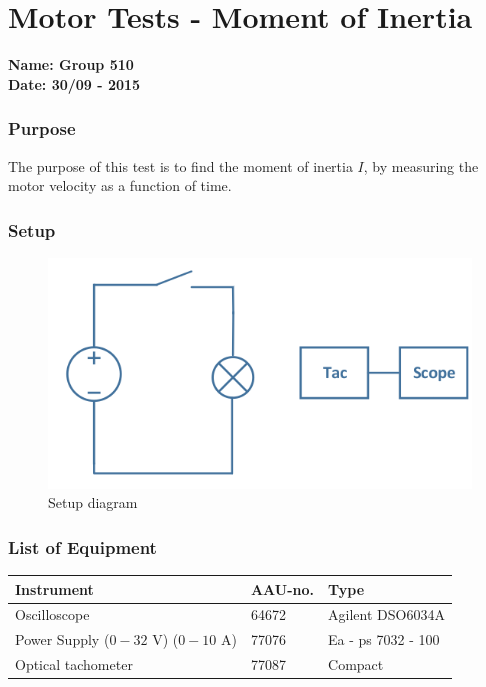 \pagebreak
\section{Motor Tests - Moment of Inertia} \label{app:motorTestMomentOfInertia}
\textbf{Name: Group 510}\\
\textbf{Date: 30/09 - 2015}

\subsubsection{Purpose}
The purpose of this test is to find the moment of inertia $I$, by measuring the motor velocity as a function of time.

\subsubsection{Setup}
\begin{figure}[H]
  \centering
	\includegraphics[scale=0.5]{figures/MotorTest8.png}
	\caption{Setup diagram}
\end{figure}

\subsubsection{List of Equipment}

\begin{table}[H]
\begin{tabular}{|l|l|p{4cm}|}
\hline%
  \textbf{Instrument}                        &  \textbf{AAU-no.}  &  \textbf{Type}       \\
\hline%
  Oscilloscope                               &  64672             &  Agilent DSO6034A    \\
\hline%
  Power Supply ($0 - 32$ V) ($0 - 10$ A)     &  77076             &  Ea - ps 7032 - 100  \\
\hline%
  Optical tachometer                         &  77087             &  Compact             \\
\hline%
\end{tabular}
\end{table}

